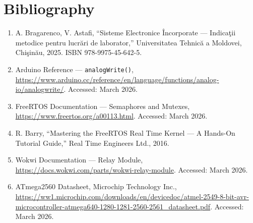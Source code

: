 \section{Bibliography}

\begin{enumerate}
    \item A. Bragarenco, V. Astafi, ``Sisteme Electronice \^{I}ncorporate --- Indica\c{t}ii metodice pentru lucr\u{a}ri de laborator,'' Universitatea Tehnic\u{a} a Moldovei, Chi\c{s}in\u{a}u, 2025. ISBN 978-9975-45-642-5.

    \item Arduino Reference --- \texttt{analogWrite()}, \url{https://www.arduino.cc/reference/en/language/functions/analog-io/analogwrite/}. Accessed: March 2026.

    \item FreeRTOS Documentation --- Semaphores and Mutexes, \url{https://www.freertos.org/a00113.html}. Accessed: March 2026.

    \item R. Barry, ``Mastering the FreeRTOS Real Time Kernel --- A Hands-On Tutorial Guide,'' Real Time Engineers Ltd., 2016.

    \item Wokwi Documentation --- Relay Module, \url{https://docs.wokwi.com/parts/wokwi-relay-module}. Accessed: March 2026.

    \item ATmega2560 Datasheet, Microchip Technology Inc., \url{https://ww1.microchip.com/downloads/en/devicedoc/atmel-2549-8-bit-avr-microcontroller-atmega640-1280-1281-2560-2561_datasheet.pdf}. Accessed: March 2026.
\end{enumerate}
